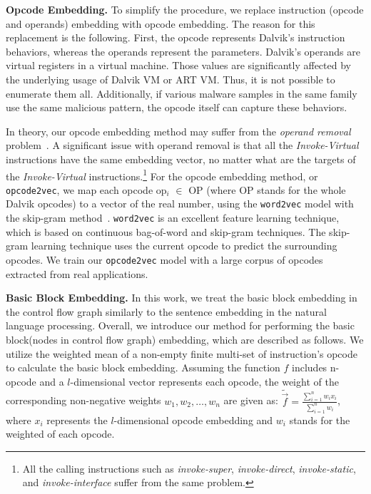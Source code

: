 \documentclass[runningheads]{llncs}
\begin{document}
\medskip \noindent \textbf{Opcode Embedding.}
To simplify the procedure, we replace instruction (opcode and operands) embedding with opcode embedding. The reason for this replacement is the following. First, the opcode represents Dalvik's instruction behaviors, whereas the operands represent the parameters. Dalvik's operands are virtual registers in a virtual machine. Those values are significantly affected by the underlying usage of Dalvik VM or ART VM. Thus, it is not possible to enumerate them all. Additionally, if various malware samples in the same family use the same malicious pattern, the opcode itself can capture these behaviors.

In theory, our opcode embedding method may suffer from the \textit{operand removal} problem~\cite{haq2019survey}. A significant issue with operand removal is that all the \textit{Invoke-Virtual} instructions have the same embedding vector, no matter what are the targets of the \textit{Invoke-Virtual} instructions.\footnote{All the calling instructions such as \textit{invoke-super}, \textit{invoke-direct},\textit{ invoke-static}, and \textit{invoke-interface} suffer from the same problem.} For the opcode embedding method, or \texttt{opcode2vec}, we map each opcode op$_i$ $\in$ OP (where OP stands for the whole Dalvik opcodes) to a vector of the real number, using the \texttt{word2vec} model with the skip-gram method~\cite{mikolov2013distributed}. \texttt{word2vec} is an excellent feature learning technique, which is based on continuous bag-of-word and skip-gram techniques. The skip-gram learning technique uses the current opcode to predict the surrounding opcodes. We train our \texttt{opcode2vec} model with a large corpus of opcodes extracted from real applications.


\medskip \noindent \textbf{Basic Block Embedding.}
In this work, we treat the basic block embedding in the control flow graph similarly to the sentence embedding in the natural language processing. Overall, we introduce our method for performing the basic block(nodes in control flow graph) embedding, which are described as follows. We utilize the weighted mean of a non-empty finite multi-set of instruction's opcode to calculate the basic block embedding. Assuming the function $f$ includes n-opcode and a $l$-dimensional vector represents each opcode, the weight of the corresponding non-negative weights ${w_1,w_2,\dots,w_n}$ are given as: $\tilde{\vec{f}} = \frac{\sum_{i=1}^{n}{w_i x_i}}{\sum_{i=1}^{n}w_i}$, where $x_i$ represents the $l$-dimensional opcode embedding and $w_i$ stands for the weighted of each opcode.
\end{document}

